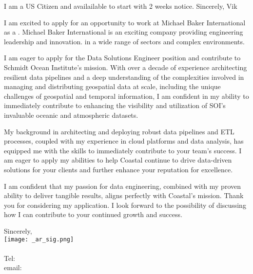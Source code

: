 \documentclass[letterpaper]{article}
\begin{document}
I am a US Citizen and availailable to start with 2 weeks notice.
Sincerely, Vik

I am excited to apply for an opportunity to work at Michael Baker International as a \JobTitle.
Michael Baker International is an exciting company providing engineering leadership and innovation.
in a wide range of sectors and complex environments.

I am eager to apply for the Data Solutions Engineer position and contribute to Schmidt Ocean Institute's mission.
With over a decade of experience architecting resilient data pipelines and a deep understanding of the
complexities involved in managing and distributing geospatial data at scale,
including the unique challenges of geospatial and temporal information, I am confident in my ability to immediately contribute to enhancing the visibility
and utilization of SOI's invaluable oceanic and atmospheric datasets.

My background in architecting and deploying robust data pipelines and ETL
processes, coupled with my experience in cloud platforms and data analysis, has
equipped me with the skills to immediately contribute to your team's success. I
am eager to apply my abilities to help Coastal continue to drive data-driven
solutions for your clients and further enhance your reputation for excellence.

I am confident that my passion for data engineering, combined with my proven
ability to deliver tangible results, aligns perfectly with Coastal's mission.
Thank you for considering my application. I look forward to the possibility of
discussing how I can contribute to your continued growth and success.

Sincerely,\\
    \hspace{1em}
    \texttt{[image: \_ar\_sig.png]} \\
    \CVsigname \\
    \small
    Tel: \CVphone \\
    email: \CVemail
\end{document}
